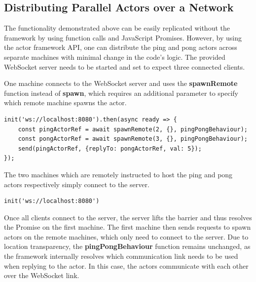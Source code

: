 \documentclass[oneside]{um-fict}
\begin{document}
\subsection{Distributing Parallel Actors over a Network}
The functionality demonstrated above can be easily replicated without the framework by using function calls and JavaScript Promises. However, by using the actor framework API, one can distribute the ping and pong actors across separate machines with minimal change in the code's logic. The provided WebSocket server needs to be started and set to expect three connected clients. 

One machine connects to the WebSocket server and uses the \textbf{spawnRemote} function instead of \textbf{spawn}, which requires an additional parameter to specify which remote machine spawns the actor.
\begin{lstlisting}
init('ws://localhost:8080').then(async ready => {
    const pingActorRef = await spawnRemote(2, {}, pingPongBehaviour);
    const pongActorRef = await spawnRemote(3, {}, pingPongBehaviour);
    send(pingActorRef, {replyTo: pongActorRef, val: 5});
});
\end{lstlisting}

The two machines which are remotely instructed to host the ping and pong actors respectively simply connect to the server.
\begin{lstlisting}
init('ws://localhost:8080')
\end{lstlisting}

Once all clients connect to the server, the server lifts the barrier and thus resolves the Promise on the first machine. The first machine then sends requests to spawn actors on the remote machines, which only need to connect to the server. Due to location transparency, the \textbf{pingPongBehaviour} function remains unchanged, as the framework internally resolves which communication link needs to be used when replying to the actor. In this case, the actors communicate with each other over the WebSocket link.
\end{document}
